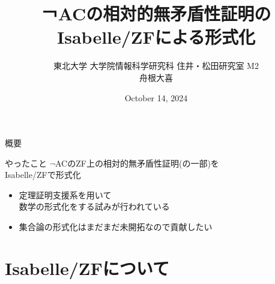 \documentclass[17pt,aspectratio=169]{beamer}
\title{￢ACの相対的無矛盾性証明のIsabelle/ZFによる形式化}
\author{東北大学 大学院情報科学研究科 住井・松田研究室 M2\\ 舟根大喜}
\date{October 14, 2024}
\begin{document}
\maketitle

\begin{frame}{概要}
    \begin{itembox}[l]{やったこと}
        $\neg$ACのZF上の相対的無矛盾性証明{\small (の一部)}を\\
        Isabelle/ZFで形式化
    \end{itembox}
    {\small
    \begin{itemize}
        \item 定理証明支援系を用いて\\
        数学の形式化をする試みが行われている
        \item 集合論の形式化はまだまだ未開拓なので貢献したい
    \end{itemize}}
\end{frame}

\section{Isabelle/ZFについて}
\end{document}
